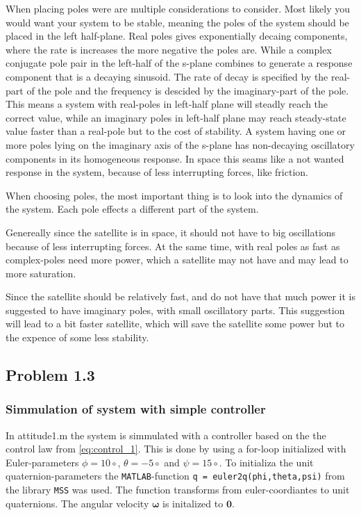 When placing poles were are multiple considerations to consider. Most likely you would want your system to be stable, meaning the poles of the system should be placed in the left half-plane. Real poles gives exponentially decaing components, where the rate is increases the more negative the poles are. While a complex conjugate pole pair in the left-half of the s-plane combines to generate a response component that is a decaying sinusoid. The rate of decay is specified by the real-part of the pole and the frequency is descided by the imaginary-part of the pole. This means a system with real-poles in left-half plane will steadly reach the correct value, while an imaginary poles in left-half plane may reach steady-state value faster than a real-pole but to the cost of stability. A system having one or more poles lying on the imaginary axis of the s-plane has non-decaying oscillatory components in its homogeneous response. In space this seams like a not wanted response in the system, because of less interrupting forces, like friction. 

When choosing poles, the most important thing is to look into the dynamics of the system. Each pole effects a different part of the system.  

Genereally since the satellite is in space, it should not have to big oscillations because of less interrupting forces. At the same time, with real poles as fast as complex-poles need more power, which a satellite may not have and may lead to more saturation.

Since the satellite should be relatively fast, and do not have that much power it is suggested to have imaginary poles, with small oscillatory parts. This suggestion will lead to a bit faster satellite, which will save the satellite some power but to the expence of some less stability.  

\subsection*{Problem 1.3}
\subsubsection*{Simmulation of system with simple controller}

In {\color{blue}  attitude1.m } the system is simmulated with a controller based on the the control law from \eqref{eq:control_1}. This is done by using a for-loop initialized with Euler-parameters $\phi = 10 \circ$, $\theta = -5 \circ$ and $\psi = 15  \circ$. To initializa the unit quaternion-parameters the \texttt{MATLAB}-function \texttt{q = euler2q(phi,theta,psi)} from the library \texttt{MSS} was used. The function transforms from euler-coordiantes to unit quaternions. The angular velocity $\boldsymbol{\omega}$ is initalized to $\mathbf{0}$. 

